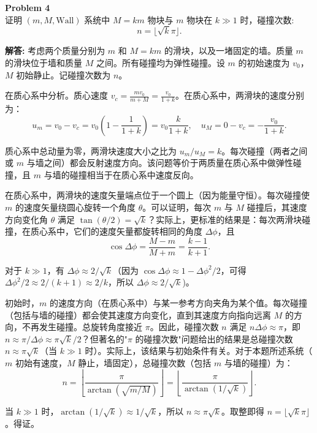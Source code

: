 \documentclass[12pt, a4paper, oneside]{ctexart}
\newenvironment{solution}{\par\noindent\textbf{解答:}\quad}{\par}
\begin{document}
\begin{mdframed}[backgroundcolor=gray!10, linewidth=0pt]
    \textbf{Problem 4} \\
    证明 \((m, M, \text{Wall})\) 系统中 \(M = k m\) 物块与 \(m\) 物块在 \(k \gg 1\) 时，碰撞次数:
    \[
    n = \lfloor \sqrt{k} \pi \rfloor.
    \]
\end{mdframed}
\begin{solution}
    考虑两个质量分别为 \(m\) 和 \(M = k m\) 的滑块，以及一堵固定的墙。质量 \(m\) 的滑块位于墙和质量 \(M\) 之间。所有碰撞均为弹性碰撞。设 \(m\) 的初始速度为 \(v_0\)，\(M\) 初始静止。记碰撞次数为 \(n\)。
    
    在质心系中分析。质心速度 \(v_c = \frac{m v_0}{m + M} = \frac{v_0}{1 + k}\)。在质心系中，两滑块的速度分别为：
    \[
    u_m = v_0 - v_c = v_0 \left(1 - \frac{1}{1+k}\right) = v_0 \frac{k}{1+k}, \quad u_M = 0 - v_c = -\frac{v_0}{1+k}.
    \]
    
    质心系中总动量为零，两滑块速度大小之比为 \(u_m / u_M = k\)。每次碰撞（两者之间或 \(m\) 与墙之间）都会反射速度方向。该问题等价于两质量在质心系中做弹性碰撞，且 \(m\) 与墙的碰撞相当于在质心系中速度反向。
    
    在质心系中，两滑块的速度矢量端点位于一个圆上（因为能量守恒）。每次碰撞使 \(m\) 的速度矢量绕圆心旋转一个角度 \(\theta\)。可以证明，每次 \(m\) 与 \(M\) 碰撞后，其速度方向变化角 \(\theta\) 满足 \(\tan(\theta/2) = \sqrt{k}\)？实际上，更标准的结果是：每次两滑块碰撞，在质心系中，它们的速度矢量都旋转相同的角度 \(\Delta \phi\)，且
    \[
    \cos \Delta \phi = \frac{M - m}{M + m} = \frac{k - 1}{k + 1}.
    \]
    
    对于 \(k \gg 1\)，有 \(\Delta \phi \approx 2/\sqrt{k}\)（因为 \(\cos \Delta \phi \approx 1 - \Delta \phi^2/2\)，可得 \(\Delta \phi^2/2 \approx 2/(k+1) \approx 2/k\)，所以 \(\Delta \phi \approx 2/\sqrt{k}\))。
    
    初始时，\(m\) 的速度方向（在质心系中）与某一参考方向夹角为某个值。每次碰撞（包括与墙的碰撞）都会使其速度方向变化，直到其速度方向指向远离 \(M\) 的方向，不再发生碰撞。总旋转角度接近 \(\pi\)。因此，碰撞次数 \(n\) 满足 \(n \Delta \phi \approx \pi\)，即 \(n \approx \pi / \Delta \phi \approx \pi \sqrt{k} / 2\)？但著名的"\(\pi\) 的碰撞次数"问题给出的结果是总碰撞次数 \(n \approx \pi \sqrt{k}\)（当 \(k \gg 1\) 时）。实际上，该结果与初始条件有关。对于本题所述系统（\(m\) 初始有速度，\(M\) 静止，墙固定），总碰撞次数（包括 \(m\) 与墙的碰撞）为：
    \[
    n = \left\lfloor \frac{\pi}{\arctan(\sqrt{m/M})} \right\rfloor = \left\lfloor \frac{\pi}{\arctan(1/\sqrt{k})} \right\rfloor.
    \]
    
    当 \(k \gg 1\) 时，\(\arctan(1/\sqrt{k}) \approx 1/\sqrt{k}\)，所以 \(n \approx \pi \sqrt{k}\)。取整即得 \(n = \lfloor \sqrt{k} \pi \rfloor\)。得证。
\end{solution}
\end{document}
